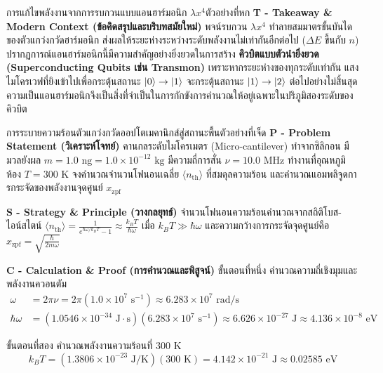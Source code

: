 \begin{psctbox}{การแก้ไขพลังงานจากการรบกวนแบบแอนฮาร์มอนิก $\lambda x^4$}{ตัวอย่างที่หก}
\vspace{6pt}
\noindent\textbf{T - Takeaway \& Modern Context (ข้อคิดสรุปและบริบทสมัยใหม่)} พจน์รบกวน $\lambda x^4$ ทำลายสมมาตรขั้นบันไดของตัวแกว่งกวัดฮาร์มอนิก ส่งผลให้ระยะห่างระหว่างระดับพลังงานไม่เท่ากันอีกต่อไป ($\Delta E$ ขึ้นกับ $n$) ปรากฏการณ์แอนฮาร์มอนิกนี้มีความสำคัญอย่างยิ่งยวดในการสร้าง \textbf{คิวบิตแบบตัวนำยิ่งยวด (Superconducting Qubits เช่น Transmon)} เพราะหากระยะห่างของทุกระดับเท่ากัน แสงไมโครเวฟที่ยิงเข้าไปเพื่อกระตุ้นสถานะ $\ket{0} \to \ket{1}$ จะกระตุ้นสถานะ $\ket{1} \to \ket{2}$ ต่อไปอย่างไม่สิ้นสุด ความเป็นแอนฮาร์มอนิกจึงเป็นสิ่งที่จำเป็นในการกักขังการคำนวณให้อยู่เฉพาะในปริภูมิสองระดับของคิวบิต
\end{psctbox}

\begin{psctbox}{การระบายความร้อนตัวแกว่งกวัดออปโตเมคานิกส์สู่สถานะพื้น}{ตัวอย่างที่เจ็ด}
\noindent\textbf{P - Problem Statement (วิเคราะห์โจทย์)} คานกลระดับไมโครเมตร (Micro-cantilever) ทำจากซิลิกอน มีมวลยังผล $m = 1.0\text{ ng} = 1.0 \times 10^{-12}\text{ kg}$ มีความถี่การสั่น $\nu = 10.0\text{ MHz}$ ทำงานที่อุณหภูมิห้อง $T = 300\text{ K}$ จงคำนวณจำนวนโฟนอนเฉลี่ย $\langle n_{\text{th}} \rangle$ ที่สมดุลความร้อน และคำนวณแอมพลิจูดการกระจัดของพลังงานจุดศูนย์ $x_{\text{zpf}}$

\vspace{6pt}
\noindent\textbf{S - Strategy \& Principle (วางกลยุทธ์)} จำนวนโฟนอนความร้อนคำนวณจากสถิติโบส-ไอน์สไตน์ $\langle n_{\text{th}} \rangle = \frac{1}{e^{\hbar\omega/k_B T} - 1} \approx \frac{k_B T}{\hbar\omega}$ เมื่อ $k_B T \gg \hbar\omega$ และความกว้างการกระจัดจุดศูนย์คือ $x_{\text{zpf}} = \sqrt{\frac{\hbar}{2m\omega}}$

\vspace{6pt}
\noindent\textbf{C - Calculation \& Proof (การคำนวณและพิสูจน์)}
ขั้นตอนที่หนึ่ง คำนวณความถี่เชิงมุมและพลังงานควอนตัม
\begin{align}
\omega &= 2\pi\nu = 2\pi(1.0 \times 10^7\text{ s}^{-1}) \approx 6.283 \times 10^7\text{ rad/s} \\
\hbar\omega &= (1.0546 \times 10^{-34}\text{ J}\cdot\text{s})(6.283 \times 10^7\text{ s}^{-1}) \approx 6.626 \times 10^{-27}\text{ J} \approx 4.136 \times 10^{-8}\text{ eV}
\end{align}

ขั้นตอนที่สอง คำนวณพลังงานความร้อนที่ $300\text{ K}$
\begin{equation}
k_B T = (1.3806 \times 10^{-23}\text{ J/K})(300\text{ K}) = 4.142 \times 10^{-21}\text{ J} \approx 0.02585\text{ eV}
\end{equation}


\end{psctbox}
